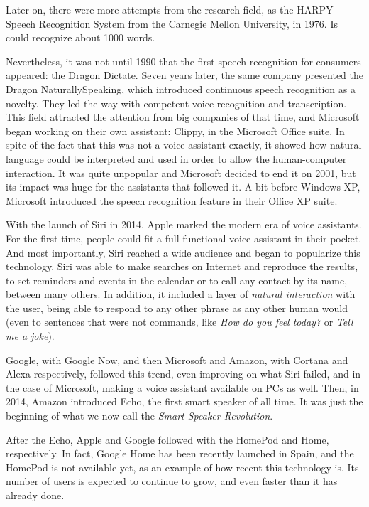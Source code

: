 Later on, there were more attempts from the research field, as the HARPY Speech Recognition System from the Carnegie
Mellon University, in 1976.\cite{lowerre76} Is could recognize about 1000 words.

Nevertheless, it was not until 1990 that the first speech recognition for consumers appeared: the Dragon Dictate. Seven years
later, the same company presented the Dragon NaturallySpeaking, which introduced continuous speech recognition as a novelty.
They led the way with competent voice recognition and transcription. This field attracted the attention from big companies of that 
time, and Microsoft began working on their own assistant: Clippy, in the Microsoft Office suite. In spite of the fact that this was 
not a voice assistant exactly, it showed how natural language could be interpreted and used in order to allow the human-computer
interaction. It was quite unpopular and Microsoft decided to end it on 2001, but its impact was huge for the assistants that followed
it. A bit before Windows XP, Microsoft introduced the speech recognition feature in their Office XP suite.

With the launch of Siri in 2014, Apple marked the modern era of voice assistants. For the first time, people could fit a full functional
voice assistant in their pocket. And most importantly, Siri reached a wide audience and began to popularize this technology.
Siri was able to make searches on Internet and reproduce the results, to set reminders and events in the calendar or to call any
contact by its name, between many others. In addition, it included a layer of \textit{natural interaction} with the user, being able to 
respond to any other phrase as any other human would (even to sentences that were not commands, like \textit{How do you feel 
today?} or \textit{Tell me a joke}).

Google, with Google Now, and then Microsoft and Amazon, with Cortana and Alexa respectively, followed this trend, even improving
on what Siri failed, and in the case of Microsoft, making a voice assistant available on PCs as well. Then, in 2014, Amazon introduced
Echo, the first smart speaker of all time. It was just the beginning of what we now call the \textit{Smart Speaker Revolution}.\cite{voicebotTimeline}

After the Echo, Apple and Google followed with the HomePod and Home, respectively. In fact, Google Home has been recently
launched in Spain, and the HomePod is not available yet, as an example of how recent this technology is. Its number of users is 
expected to continue to grow, and even faster than it has already done.\cite{statistaDigitalAssistants}

